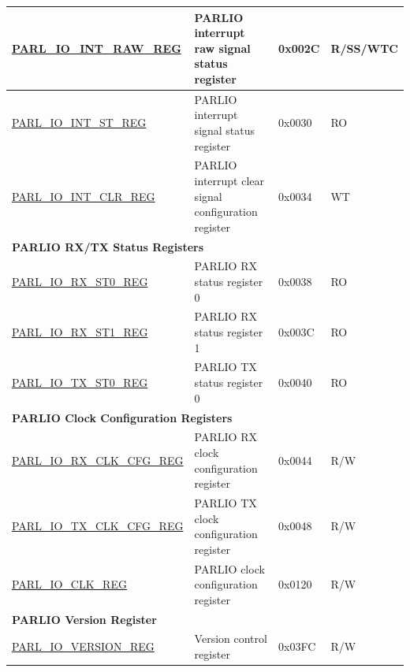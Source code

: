 \begin{longtable}{ | p{5cm} | p{7.8cm} | p{1.3cm} | p{1.6cm} | }
\hyperref[regdesc:PARLIOINTRAWREG]{PARL\_IO\_INT\_RAW\_REG} & PARLIO interrupt raw signal status register & 0x002C & R/SS/WTC \\ \hline
\hyperref[regdesc:PARLIOINTSTREG]{PARL\_IO\_INT\_ST\_REG} & PARLIO interrupt signal status register & 0x0030 & RO \\ \hline
\hyperref[regdesc:PARLIOINTCLRREG]{PARL\_IO\_INT\_CLR\_REG} & PARLIO interrupt  clear signal configuration register & 0x0034 & WT \\ \hline
\multicolumn{4}{|l|}{\textbf{PARLIO RX/TX Status Registers}} \\ \hline
\hyperref[regdesc:PARLIORXST0REG]{PARL\_IO\_RX\_ST0\_REG} & PARLIO RX status register 0 & 0x0038 & RO \\ \hline
\hyperref[regdesc:PARLIORXST1REG]{PARL\_IO\_RX\_ST1\_REG} & PARLIO RX status register 1 & 0x003C & RO \\ \hline
\hyperref[regdesc:PARLIOTXST0REG]{PARL\_IO\_TX\_ST0\_REG} & PARLIO TX status register 0 & 0x0040 & RO \\ \hline
\multicolumn{4}{|l|}{\textbf{PARLIO Clock Configuration Registers}} \\ \hline
\hyperref[regdesc:PARLIORXCLKCFGREG]{PARL\_IO\_RX\_CLK\_CFG\_REG} & PARLIO RX clock configuration register & 0x0044 & R/W \\ \hline
\hyperref[regdesc:PARLIOTXCLKCFGREG]{PARL\_IO\_TX\_CLK\_CFG\_REG} & PARLIO TX clock configuration register & 0x0048 & R/W \\ \hline
\hyperref[regdesc:PARLIOCLKREG]{PARL\_IO\_CLK\_REG} & PARLIO clock configuration register & 0x0120 & R/W \\ \hline
\multicolumn{4}{|l|}{\textbf{PARLIO Version Register}} \\ \hline
\hyperref[regdesc:PARLIOVERSIONREG]{PARL\_IO\_VERSION\_REG} & Version control register & 0x03FC & R/W \\ \hline
\end{longtable}
